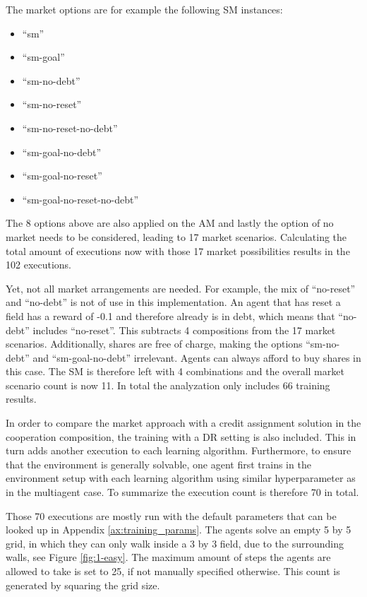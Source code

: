 The market options are for example the following SM instances: 
\begin{itemize}
    \item ``sm''
    \item ``sm-goal''
    \item ``sm-no-debt''
    \item ``sm-no-reset''
    \item ``sm-no-reset-no-debt''
    \item ``sm-goal-no-debt''
    \item ``sm-goal-no-reset''
    \item ``sm-goal-no-reset-no-debt''
\end{itemize}
The 8 options above are also applied on the AM and lastly the option of no market needs to be considered, leading to 17 market scenarios. Calculating the total amount of executions now with those 17 market possibilities results in the 102 executions.

Yet, not all market arrangements are needed. For example, the mix of ``no-reset'' and ``no-debt'' is not of use in this implementation. An agent that has reset a field has a reward of -0.1 and therefore already is in debt, which means that ``no-debt'' includes ``no-reset''. This subtracts 4 compositions from the 17 market scenarios. Additionally, shares are free of charge, making the options ``sm-no-debt'' and ``sm-goal-no-debt'' irrelevant. Agents can always afford to buy shares in this case. The SM is therefore left with 4 combinations and the overall market scenario count is now 11. In total the analyzation only includes 66 training results. 

In order to compare the market approach with a credit assignment solution in the cooperation composition, the training with a DR setting is also included. This in turn adds another execution to each learning algorithm. Furthermore, to ensure that the environment is generally solvable, one agent first trains in the environment setup with each learning algorithm using similar hyperparameter as in the multiagent case. To summarize the execution count is therefore 70 in total.

Those 70 executions are mostly run with the default parameters that can be looked up in Appendix \ref{ax:training_params}. The agents solve an empty 5 by 5 grid, in which they can only walk inside a 3 by 3 field, due to the surrounding walls, see Figure \ref{fig:1-easy}. The maximum amount of steps the agents are allowed to take is set to 25, if not manually specified otherwise. This count is generated by squaring the grid size.

